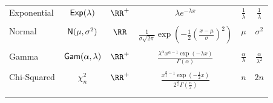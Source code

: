 \begin{longtable}{lccccc}
    Exponential & ${\sf Exp} (\lambda)$         & $\RR^{+}$                      & $\lambda e^{-\lambda x}$                                                                                 & $\frac{1}{\lambda}$      & $\frac{1}{\lambda}$        \\\\
    Normal      & ${\sf N} (\mu, \sigma^2)$   & $\RR$                          & $\frac{1}{\sigma \sqrt{2 \pi}} \exp \left( -\frac{1}{2} \left( \frac{x - \mu}{\sigma} \right)^2 \right)$ & $\mu$                    & $\sigma^2$                 \\\\
    Gamma       & ${\sf Gam} (\alpha, \lambda)$ & $\RR^{+}$                      & $\frac{\lambda^{\alpha} x^{\alpha - 1} \exp (-\lambda x)}{\Gamma (\alpha)}$                              & $\frac{\alpha}{\lambda}$ & $\frac{\alpha}{\lambda^2}$ \\\\
    Chi-Squared & $\chi^2_{n}$               & $\RR^{+}$                      & $\frac{x^{\frac{n}{2} - 1} \exp (-\frac{1}{2} x)}{2^{\frac{n}{2}} \Gamma (\frac{n}{2})}$                 & $n$                      & $2n$                       \\\\

    \\\bottomrule
    \hline
\end{longtable}